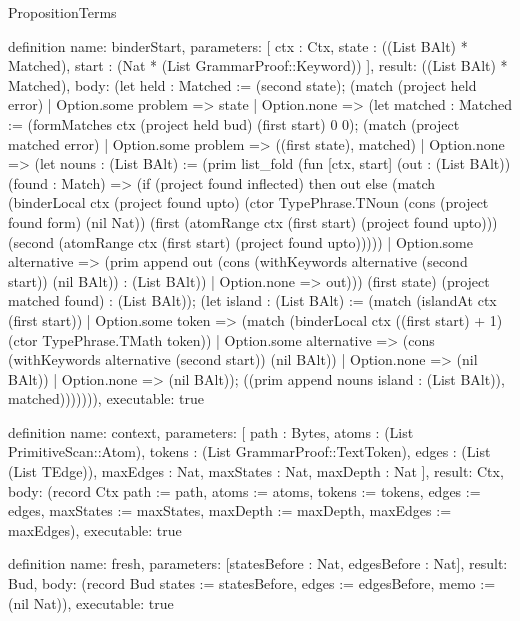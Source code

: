 \begin{lexlean}{PropositionTerms}
\begin{semanticmodule}
definition{
  name: binderStart,
  parameters: [
    ctx : Ctx,
    state : ((List BAlt) * Matched),
    start : (Nat * (List GrammarProof::Keyword))
  ],
  result: ((List BAlt) * Matched),
  body: (let held : Matched := (second state); (match (project held error)
    | Option.some problem => state
    | Option.none => (let matched : Matched := (formMatches ctx (project held bud) (first start) 0 0); (match (project matched error)
      | Option.some problem => ((first state), matched)
      | Option.none => (let nouns : (List BAlt) := (prim list_fold (fun [ctx, start] (out : (List BAlt)) (found : Match) => (if (project found inflected) then out else (match (binderLocal ctx (project found upto) (ctor TypePhrase.TNoun (cons (project found form) (nil Nat)) (first (atomRange ctx (first start) (project found upto))) (second (atomRange ctx (first start) (project found upto)))))
        | Option.some alternative => (prim append out (cons (withKeywords alternative (second start)) (nil BAlt)) : (List BAlt))
        | Option.none => out))) (first state) (project matched found) : (List BAlt)); (let island : (List BAlt) := (match (islandAt ctx (first start))
        | Option.some token => (match (binderLocal ctx ((first start) + 1) (ctor TypePhrase.TMath token))
          | Option.some alternative => (cons (withKeywords alternative (second start)) (nil BAlt))
          | Option.none => (nil BAlt))
        | Option.none => (nil BAlt)); ((prim append nouns island : (List BAlt)), matched))))))),
  executable: true
}

definition{
  name: context,
  parameters: [
    path : Bytes,
    atoms : (List PrimitiveScan::Atom),
    tokens : (List GrammarProof::TextToken),
    edges : (List (List TEdge)),
    maxEdges : Nat,
    maxStates : Nat,
    maxDepth : Nat
  ],
  result: Ctx,
  body: (record Ctx {path := path, atoms := atoms, tokens := tokens, edges := edges, maxStates := maxStates, maxDepth := maxDepth, maxEdges := maxEdges}),
  executable: true
}

definition{
  name: fresh,
  parameters: [statesBefore : Nat, edgesBefore : Nat],
  result: Bud,
  body: (record Bud {states := statesBefore, edges := edgesBefore, memo := (nil Nat)}),
  executable: true
}


\end{semanticmodule}
\end{lexlean}
